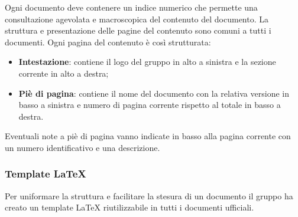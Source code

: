             Ogni documento deve contenere un indice numerico che permette una consultazione agevolata e macroscopica del contenuto del documento.         
            La struttura e presentazione delle pagine del contenuto sono comuni a tutti i documenti. Ogni pagina del contenuto è così strutturata:
                \begin{itemize}
                    \item\textbf{Intestazione}: contiene il logo del gruppo in alto a sinistra e la sezione corrente in alto a destra;
                    \item\textbf{Piè di pagina}: contiene il nome del documento con la relativa versione in basso a sinistra e numero di pagina corrente rispetto al totale in basso a destra. 
                \end{itemize}
                Eventuali note a piè di pagina vanno indicate in basso alla pagina corrente con un numero identificativo e una descrizione.
            
        \subsubsection{Template \LaTeX{}}
        Per uniformare la struttura e facilitare la stesura di un documento il gruppo ha creato un template \LaTeX{} riutilizzabile in tutti i documenti ufficiali.  


